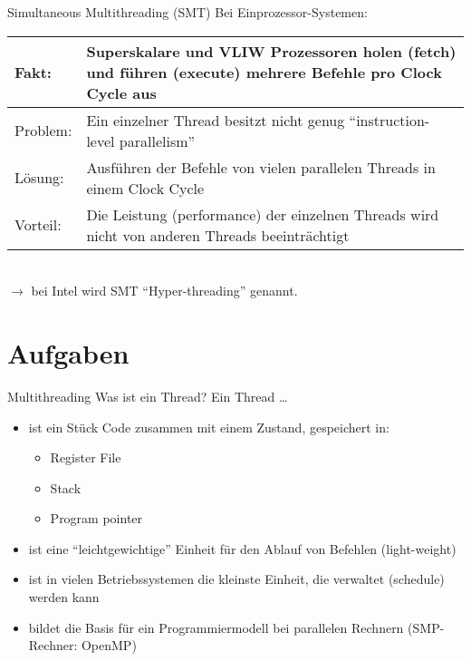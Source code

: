 \begin{defi}[Threads]{Simultaneous Multithreading (SMT)}
    Bei Einprozessor-Systemen: \\
    \begin{tabularx}{\textwidth}{|lX|}
        \toprule
        Fakt:    & Superskalare und VLIW Prozessoren holen (fetch) und führen (execute) mehrere Befehle pro Clock Cycle aus \\
        \midrule
        Problem: & Ein einzelner Thread besitzt nicht genug \enquote{instruction-level parallelism}                         \\
        \midrule
        Lösung:  & Ausführen der Befehle von vielen parallelen Threads in einem Clock Cycle                                 \\
        \midrule
        Vorteil: & Die Leistung (performance) der einzelnen Threads wird nicht von anderen Threads beeinträchtigt           \\
        \bottomrule
    \end{tabularx}
    \\
    $\to$ bei Intel wird SMT \enquote{Hyper-threading} genannt.
\end{defi}

\section{Aufgaben}

\begin{aufgabe}{Multithreading}
    Was ist ein Thread?
    \tcblower
    Ein Thread \ldots
    \begin{itemize}[$\ldots$]
        \item ist ein Stück Code zusammen mit einem Zustand, gespeichert in:
              \begin{itemize}
                  \item Register File
                  \item Stack
                  \item Program pointer
              \end{itemize}
        \item ist eine \enquote{leichtgewichtige} Einheit für den Ablauf von Befehlen (light-weight)
        \item ist in vielen Betriebssystemen die kleinste Einheit, die verwaltet (schedule) werden kann
        \item bildet die Basis für ein Programmiermodell bei parallelen Rechnern (SMP-Rechner: OpenMP)
    \end{itemize}
\end{aufgabe}

